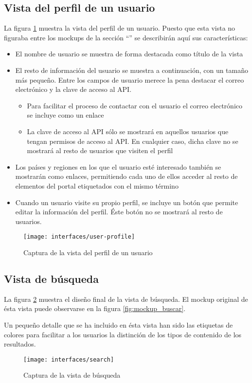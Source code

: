 \subsection{Vista del perfil de un usuario}
La figura \ref{fig:interface_perfil_usuario} muestra la vista del perfil de un usuario.  Puesto que esta vista no figuraba entre los mockups de la sección ``'' se describirán aquí sus características:
\begin{itemize}
	\item El nombre de usuario se muestra de forma destacada como título de la vista
	\item El resto de información del usuario se muestra a continuación, con un tamaño más pequeño.  Entre los campos de usuario merece la pena destacar el correo electrónico y la clave de acceso al API.
	\begin{itemize}
		\item Para facilitar el proceso de contactar con el usuario el correo electrónico se incluye como un enlace
		\item La clave de acceso al API sólo se mostrará en aquellos usuarios que tengan permisos de acceso al API.  En cualquier caso, dicha clave no se mostrará al resto de usuarios que visiten el perfil
	\end{itemize}
	\item Los países y regiones en los que el usuario esté interesado también se mostrarán como enlaces, permitiendo cada uno de ellos acceder al resto de elementos del portal etiquetados con el mismo término
	\item Cuando un usuario visite su propio perfil, se incluye un botón que permite editar la información del perfil.  Éste botón no se mostrará al resto de usuarios.
\end{itemize}
\begin{figure}[h]
	\centering
	\texttt{[image: interfaces/user-profile]}
	\caption{Captura de la vista del perfil de un usuario}
	\label{fig:interface_perfil_usuario}
\end{figure}


\subsection{Vista de búsqueda}
La figura \ref{fig:interface_busqued} muestra el diseño final de la vista de búsqueda.  El mockup original de ésta vista puede observarse en la figura \ref{fig:mockup_buscar}.

Un pequeño detalle que se ha incluido en ésta vista han sido las etiquetas de colores para facilitar a los usuarios la distinción de los tipos de contenido de los resultados.
\begin{figure}[h]
	\centering
	\texttt{[image: interfaces/search]}
	\caption{Captura de la vista de búsqueda}
	\label{fig:interface_busqued}
\end{figure}